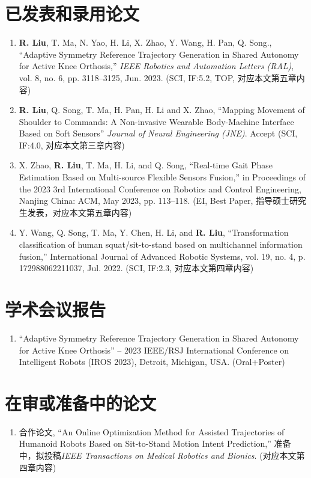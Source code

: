 
\begin{publications}

\section*{已发表和录用论文}

\begin{enumerate}
\item \textbf{R. Liu}, T. Ma, N. Yao, H. Li, X. Zhao, Y. Wang, H. Pan, Q. Song., “Adaptive Symmetry Reference Trajectory Generation in Shared Autonomy for Active Knee Orthosis,” \textit{IEEE Robotics and Automation Letters (RAL)}, vol. 8, no. 6, pp. 3118–3125, Jun. 2023. (SCI, IF:5.2, TOP, 对应本文第五章内容)
\item \textbf{R. Liu}, Q. Song, T. Ma, H. Pan, H. Li and X. Zhao, ``Mapping Movement of Shoulder to Commands: A Non-invasive Wearable Body-Machine Interface Based on Soft Sensors'' \textit{Journal of Neural Engineering (JNE)}. Accept (SCI, IF:4.0, 对应本文第三章内容)
\item X. Zhao, \textbf{R. Liu}, T. Ma, H. Li, and Q. Song, “Real-time Gait Phase Estimation Based on Multi-source Flexible Sensors Fusion,” in Proceedings of the 2023 3rd International Conference on Robotics and Control Engineering, Nanjing China: ACM, May 2023, pp. 113–118. (EI, Best Paper, 指导硕士研究生发表，对应本文第五章内容)
\item Y. Wang, Q. Song, T. Ma, Y. Chen, H. Li, and \textbf{R. Liu}, “Transformation classification of human squat/sit-to-stand based on multichannel information fusion,” International Journal of Advanced Robotic Systems, vol. 19, no. 4, p. 172988062211037, Jul. 2022. (SCI, IF:2.3, 对应本文第四章内容)
\end{enumerate}

\section*{学术会议报告}
\begin{enumerate}
\item ``Adaptive Symmetry Reference Trajectory Generation in Shared Autonomy for Active Knee Orthosis'' – 2023 IEEE/RSJ International Conference on Intelligent Robots (IROS 2023), Detroit, Michigan, USA. (Oral+Poster)
\end{enumerate}

\section*{在审或准备中的论文}
\begin{enumerate}
\item 合作论文, ``An Online Optimization Method for Assisted Trajectories of Humanoid Robots Based on Sit-to-Stand Motion Intent Prediction,'' 准备中，拟投稿\textit{IEEE Transactions on Medical Robotics and Bionics}. (对应本文第四章内容)
\end{enumerate}


\end{publications}
